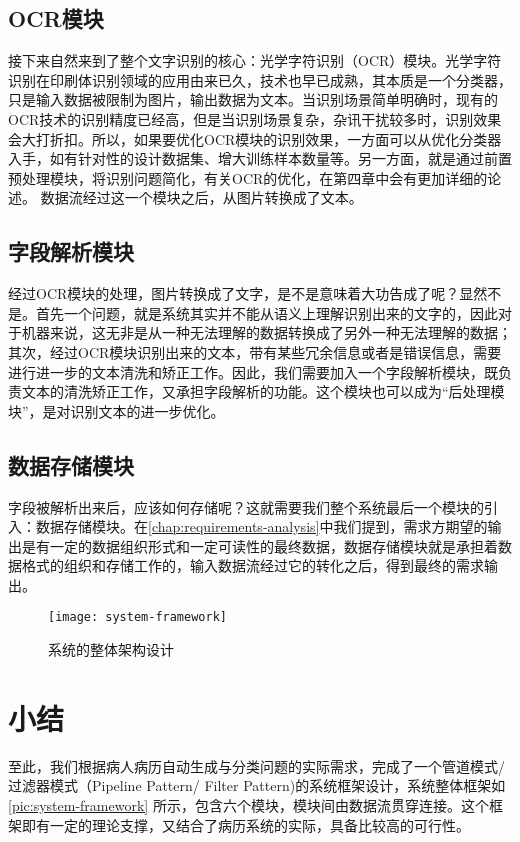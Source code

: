 \subsection{OCR模块}
接下来自然来到了整个文字识别的核心：光学字符识别（OCR）模块。光学字符识别在印刷体识别领域的应用由来已久\citep{impedovo1991optical}，技术也早已成熟，其本质是一个分类器，只是输入数据被限制为图片，输出数据为文本。当识别场景简单明确时，现有的OCR技术的识别精度已经高，但是当识别场景复杂，杂讯干扰较多时，识别效果会大打折扣。所以，如果要优化OCR模块的识别效果，一方面可以从优化分类器入手，如有针对性的设计数据集、增大训练样本数量等。另一方面，就是通过前置预处理模块，将识别问题简化，有关OCR的优化，在第四章中会有更加详细的论述。
数据流经过这一个模块之后，从图片转换成了文本。

\subsection{字段解析模块}
经过OCR模块的处理，图片转换成了文字，是不是意味着大功告成了呢？显然不是。首先一个问题，就是系统其实并不能从语义上理解识别出来的文字的，因此对于机器来说，这无非是从一种无法理解的数据转换成了另外一种无法理解的数据；其次，经过OCR模块识别出来的文本，带有某些冗余信息或者是错误信息，需要进行进一步的文本清洗和矫正工作。因此，我们需要加入一个字段解析模块，既负责文本的清洗矫正工作，又承担字段解析的功能。这个模块也可以成为“后处理模块”，是对识别文本的进一步优化。

\subsection{数据存储模块}
字段被解析出来后，应该如何存储呢？这就需要我们整个系统最后一个模块的引入：数据存储模块。在\autoref{chap:requirements-analysis}中我们提到，需求方期望的输出是有一定的数据组织形式和一定可读性的最终数据，数据存储模块就是承担着数据格式的组织和存储工作的，输入数据流经过它的转化之后，得到最终的需求输出。
\begin{figure}[htbp]
	\centering
	\caption{系统的整体架构设计}
	\texttt{[image: system-framework]}
	\label{pic:system-framework}
\end{figure}

\section{小结}
至此，我们根据病人病历自动生成与分类问题的实际需求，完成了一个管道模式/过滤器模式（Pipeline Pattern/ Filter Pattern)的系统框架设计，系统整体框架如\autoref{pic:system-framework}
所示，包含六个模块，模块间由数据流贯穿连接。这个框架即有一定的理论支撑，又结合了病历系统的实际，具备比较高的可行性。
